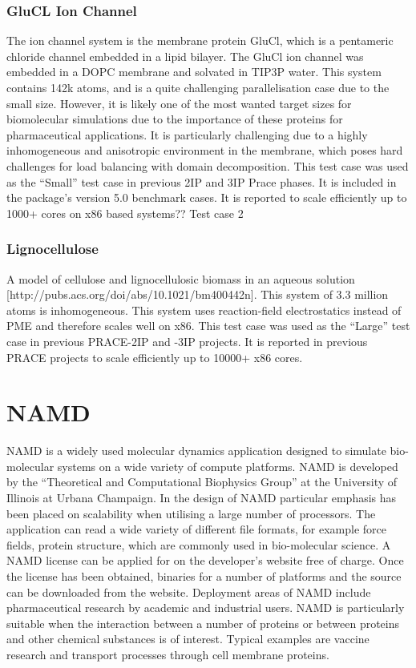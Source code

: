 \subsubsection{GluCL Ion Channel}
The ion channel system is the membrane protein GluCl, which is a pentameric chloride channel embedded in a lipid bilayer. The GluCl ion channel was embedded in a DOPC membrane and solvated in TIP3P water. This system contains 142k atoms, and is a quite challenging parallelisation case due to the small size. However, it is likely one of the most wanted target sizes for biomolecular simulations due to the importance of these proteins for pharmaceutical applications. It is particularly challenging due to a highly inhomogeneous and anisotropic environment in the membrane, which poses hard challenges for load balancing with domain decomposition.
This test case was used as the “Small” test case in previous 2IP and 3IP Prace phases. It is included in the package's version 5.0 benchmark cases. It is reported to scale efficiently up to 1000+ cores on x86 based systems??
Test case 2

\subsubsection{Lignocellulose}
A model of cellulose and lignocellulosic biomass in an aqueous solution [http://pubs.acs.org/doi/abs/10.1021/bm400442n]. This system of 3.3 million atoms is inhomogeneous. This system uses reaction-field electrostatics instead of PME and therefore scales well on x86. This test case was used as the “Large” test case in previous PRACE-2IP and -3IP projects. It is reported in previous PRACE projects to scale efficiently up to 10000+ x86 cores.

\section{NAMD}

NAMD is a widely used molecular dynamics application designed to simulate bio-molecular systems on a wide variety of compute platforms. NAMD is developed by the “Theoretical and Computational Biophysics Group” at the University of Illinois at Urbana Champaign. In the design of NAMD particular emphasis has been placed on scalability when utilising a large number of processors. The application can read a wide variety of different file formats, for example force fields, protein structure, which are commonly used in bio-molecular science. A NAMD license can be applied for on the developer’s website free of charge. Once the license has been obtained, binaries for a number of platforms and the source can be downloaded from the website. Deployment areas of NAMD include pharmaceutical research by academic and industrial users. NAMD is particularly suitable when the interaction between a number of proteins or between proteins and other chemical substances is of interest. Typical examples are vaccine research and transport processes through cell membrane proteins.

